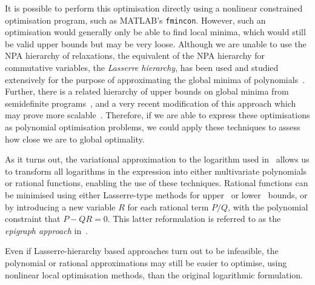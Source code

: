 \documentclass[10pt, a4paper]{article}
\numberwithin{equation}{section} %
\theoremstyle{definition}
\theoremstyle{plain}
\newcommand{\?}{\mathrel{?}} %
\begin{document}
                        It is possible to perform this optimisation directly using a nonlinear constrained optimisation program, such as MATLAB's \verb`fmincon`. However, such an optimisation would generally only be able to find local minima, which would still be valid upper bounds but may be very loose. Although we are unable to use the NPA hierarchy of relaxations, the equivalent of the NPA hierarchy for commutative variables, the \emph{Lasserre hierarchy}, has been used and studied extensively for the purpose of approximating the global minima of polynomials~\cite{LasserreHierarchy}. Further, there is a related hierarchy of upper bounds on global minima from semidefinite programs~\cite{UpperBoundsHierarchy}, and a very recent modification of this approach which may prove more scalable~\cite{LasserreUpperBoundsPushForward}. Therefore, if we are able to express these optimisations as polynomial optimisation problems, we could apply these techniques to assess how close we are to global optimality.

                        As it turns out, the variational approximation to the logarithm used in~\cite{BFF_QRE} allows us to transform all logarithms in the expression into either multivariate polynomials or rational functions, enabling the use of these techniques. Rational functions can be minimised using either Lasserre-type methods for upper~\cite{MinRational} or lower~\cite{MinRationalLower} bounds, or by introducing a new variable \(R\) for each rational term \(P/Q\), with the polynomial constraint that \(P - QR = 0\). This latter reformulation is referred to as the \emph{epigraph approach} in~\cite{MinRationalLower}.

                        Even if Lasserre-hierarchy based approaches turn out to be infeasible, the polynomial or rational approximations may still be easier to optimise, using nonlinear local optimisation methods, than the original logarithmic formulation.
\end{document}

